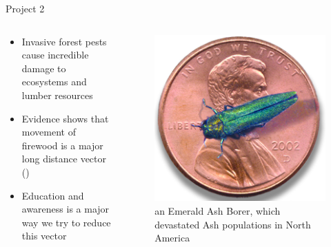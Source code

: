 \documentclass{beamer}
\begin{document}
\begin{frame}{Project 2}
    \begin{columns}
        \begin{column}{0.6\textwidth}
            \begin{itemize}
                \item Invasive forest pests cause incredible damage to ecosystems and lumber resources
                
                \item Evidence shows that movement of firewood is a major long distance vector (\citet{koch2014using})
                
                \item Education and awareness is a major way we try to reduce this vector
            \end{itemize}
        \end{column}
        \begin{column}{0.4\textwidth}
            \begin{figure}
                \includegraphics[width=\textwidth]{Emerald_ash_borer_penny.jpg}
                \caption{an Emerald Ash Borer, which devastated Ash populations in North America}                
            \end{figure}

        \end{column}
    \end{columns}
\end{frame}
\end{document}
